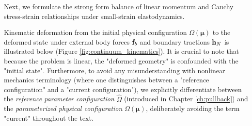Next, we formulate the strong form balance of linear momentum and Cauchy stress-strain relationships under small-strain elastodynamics.

Kinematic deformation from the initial physical configuration $\Omega(\boldsymbol{\mu})$ to the deformed state under external body forces $\mathbf{f}_b$ and boundary tractions $\mathbf{h}_N$ is illustrated below (Figure \ref{fig:continuum_kinematics}). It is crucial to note that because the problem is linear, the "deformed geometry" is confounded with the "initial state". Furthermore, to avoid any misunderstanding with nonlinear mechanics terminology (where one distinguishes between a "reference configuration" and a "current configuration"), we explicitly differentiate between the \textit{reference parameter configuration} $\hat{\Omega}$ (introduced in Chapter \ref{ch:pullback}) and the \textit{parameterized physical configuration} $\Omega(\boldsymbol{\mu})$, deliberately avoiding the term "current" throughout the text.

